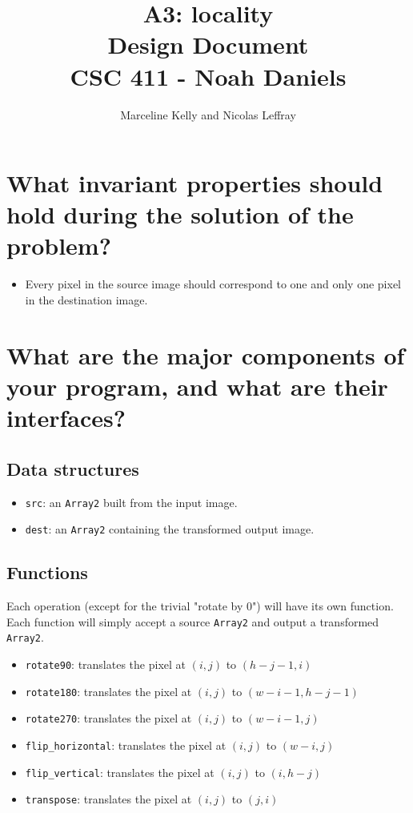 \documentclass[12pt, letterpaper]{article}
\title{A3: locality \\
    \large Design Document \\
    CSC 411 - Noah Daniels}
\author{Marceline Kelly and Nicolas Leffray}
\begin{document}
\maketitle

\section*{What invariant properties should hold during the solution of the problem?}

\begin{itemize}
    \item Every pixel in the source image should correspond to one and only one pixel in the destination image.
\end{itemize}

\section*{What are the major components of your program, and what are their interfaces?}

\subsection*{Data structures}

\begin{itemize}
    \item \verb|src|: an \verb|Array2| built from the input image.
    \item \verb|dest|: an \verb|Array2| containing the transformed output image.
\end{itemize}

\subsection*{Functions}

Each operation (except for the trivial "rotate by 0\degree") will have its own function.
Each function will simply accept a source \verb|Array2| and output a transformed \verb|Array2|. 

\begin{itemize}
    \item \verb|rotate90|: translates the pixel at $(i, j)$ to $(h-j-1, i)$
    \item \verb|rotate180|: translates the pixel at $(i, j)$ to $(w-i-1, h-j-1)$
    \item \verb|rotate270|: translates the pixel at $(i, j)$ to $(w-i-1, j)$
    \item \verb|flip_horizontal|: translates the pixel at $(i, j)$ to $(w-i, j)$
    \item \verb|flip_vertical|: translates the pixel at $(i, j)$ to $(i, h-j)$
    \item \verb|transpose|: translates the pixel at $(i, j)$ to $(j, i)$
\end{itemize}
\end{document}
